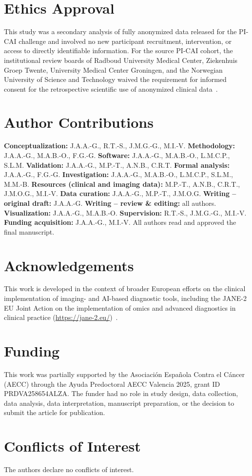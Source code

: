 \documentclass[11pt]{article}
\begin{document}
\section*{Ethics Approval}
This study was a secondary analysis of fully anonymized data released for the
PI-CAI challenge and involved no new participant recruitment, intervention, or
access to directly identifiable information. For the source PI-CAI cohort, the
institutional review boards of Radboud University Medical Center, Ziekenhuis
Groep Twente, University Medical Center Groningen, and the Norwegian University
of Science and Technology waived the requirement for informed consent for the
retrospective scientific use of anonymized clinical
data~\citep{saha2023artificial}.

\section*{Author Contributions}
\textbf{Conceptualization:} J.A.A.-G., R.T.-S., J.M.G.-G., M.I.-V.
\textbf{Methodology:} J.A.A.-G., M.A.B.-O., F.G.-G.
\textbf{Software:} J.A.A.-G., M.A.B.-O., L.M.C.P., S.L.M.
\textbf{Validation:} J.A.A.-G., M.P.-T., A.N.B., C.R.T.
\textbf{Formal analysis:} J.A.A.-G., F.G.-G.
\textbf{Investigation:} J.A.A.-G., M.A.B.-O., L.M.C.P., S.L.M., M.M.-B.
\textbf{Resources (clinical and imaging data):} M.P.-T., A.N.B., C.R.T., J.M.O.G., M.I.-V.
\textbf{Data curation:} J.A.A.-G., M.P.-T., J.M.O.G.
\textbf{Writing -- original draft:} J.A.A.-G.
\textbf{Writing -- review \& editing:} all authors.
\textbf{Visualization:} J.A.A.-G., M.A.B.-O.
\textbf{Supervision:} R.T.-S., J.M.G.-G., M.I.-V.
\textbf{Funding acquisition:} J.A.A.-G., M.I.-V.
All authors read and approved the final manuscript.

\section*{Acknowledgements}
This work is developed in the context of broader European efforts on the clinical
implementation of imaging- and AI-based diagnostic tools, including the JANE-2 EU
Joint Action on the implementation of omics and advanced diagnostics in clinical
practice (\url{https://jane-2.eu/})~\citep{GuerraNunez2026Epigenomics}.

\section*{Funding}
This work was partially supported by the Asociaci\'on Espa\~nola Contra el
C\'ancer (AECC) through the Ayuda Predoctoral AECC Valencia 2025, grant ID
PRDVA258654ALZA. The funder had no role in study design, data collection, data
analysis, data interpretation, manuscript preparation, or the decision to submit
the article for publication.

\section*{Conflicts of Interest}
The authors declare no conflicts of interest.



\end{document}
